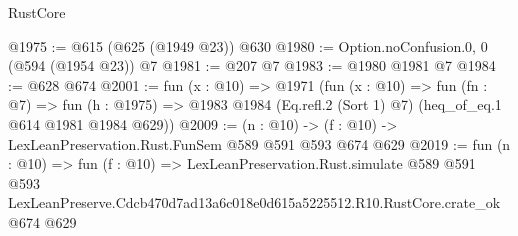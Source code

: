 \begin{lexlean}{RustCore}
\begin{coremodule}
@1975 := @615 (@625 (@1949 @23)) @630
@1980 := Option.noConfusion.{0, 0} (@594 (@1954 @23)) @7
@1981 := @207 @7
@1983 := @1980 @1981 @7
@1984 := @628 @674
@2001 := fun (x : @10) =>
  @1971
    (fun (x : @10) =>
    fun (fn : @7) =>
    fun (h : @1975) => @1983 @1984 (Eq.refl.{2} (Sort 1) @7) (heq_of_eq.{1} @614 @1981 @1984 @629))
@2009 := (n : @10) -> (f : @10) -> LexLeanPreservation.Rust.FunSem @589 @591 @593 @674 @629
@2019 := fun (n : @10) =>
  fun (f : @10) =>
  LexLeanPreservation.Rust.simulate
    @589
    @591
    @593
    LexLeanPreserve.Cdcb470d7ad13a6c018e0d615a5225512.R10.RustCore.crate_ok
    @674
    @629
\end{coremodule}
\end{lexlean}
